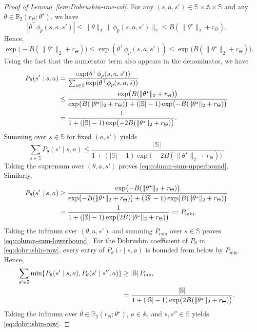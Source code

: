 \documentclass[10pt]{article} %
\theoremstyle{plain}
\theoremstyle{definition}
\theoremstyle{remark}
\newcommand{\bA}{\mathbb{A}}
\newcommand{\bB}{\mathbb{B}}
\newcommand{\bS}{\mathbb{S}}
\begin{document}
\begin{proof}[Proof of Lemma~\ref{lem:Dobrushin-row-col}]
For any \((s,a,s')\in\bS\times\bA\times\bS\) and any \(\theta\in\bB_2(r_\Theta;\theta^\star)\), we have
\[
|\theta^\top\phi_p(s,a,s')|\le\|\theta\|_2\,\|\phi_p(s,a,s')\|_2\le B(\|\theta^\star\|_2+r_\Theta).
\]
Hence,
\begin{equation}\label{eq:score-funct-bounds}
\exp\bigl(-B(\|\theta^\star\|_2+r_\Theta)\bigr)\le\exp(\theta^\top\phi_p(s,a,s'))\le\exp\bigl(B(\|\theta^\star\|_2+r_\Theta)\bigr).
\end{equation}
Using the fact that the numerator term also appears in the denominator, we have
\begin{align}\label{eq:kernel-uni-upperbound}
P_\theta(s'\mid s,a)
&=\frac{\exp(\theta^\top\phi_p(s,a,s'))}{\sum_{\bar s\in\bS}\exp(\theta^\top\phi_p(s,a,\bar s))}\notag\\
&\le \frac{\exp\bigl(B(\|\theta^\star\|_2+r_\Theta)\bigr)}
{\exp\bigl(B(\|\theta^\star\|_2+r_\Theta)\bigr)+(|\bS|-1)\exp\bigl(-B(\|\theta^\star\|_2+r_\Theta)\bigr)}\notag\\
&=
\frac{1}
{1+(|\bS|-1)\exp\bigl(-2B(\|\theta^\star\|_2+r_\Theta)\bigr)} .
\end{align}
Summing over \(s\in\bS\) for fixed \((a,s')\) yields
\[
\sum_{s\in\bS}P_\theta(s'\mid s,a)\le\frac{|\bS|}{1+(|\bS|-1)\exp\bigl(-2B(\|\theta^\star\|_2+r_\Theta)\bigr)} .
\]
Taking the supremum over \((\theta,a,s')\) proves \ref{eq:column-sum-upperbound}. Similarly,
\begin{align}\label{eq:kernel-uni-lowerbound}
P_\theta(s'\mid s,a)
&\ge\frac{\exp\bigl(-B(\|\theta^\star\|_2+r_\Theta)\bigr)}{\exp\bigl(-B(\|\theta^\star\|_2+r_\Theta)\bigr)+(|\bS|-1)\exp\bigl(B(\|\theta^\star\|_2+r_\Theta)\bigr)}\notag\\
&=\frac{1}{1+(|\bS|-1)\exp\bigl(2B(\|\theta^\star\|_2+r_\Theta)\bigr)}=:P_{\min}.
\end{align}
Taking the infimum over \((\theta,a,s')\) and summing \(P_{\min}\) over \(s\in\bS\) proves \ref{eq:column-sum-lowerbound}. For the Dobrushin coefficient of \(P_\theta\) in \ref{eq:dobrushin-row}, every entry of \(P_\theta(\cdot\mid s,a)\) is bounded from below by \(P_{\min}\). Hence,
\begin{align}\label{eq:dobcoef-p-lowerbound}
\sum_{s' \in\bS}\min\{P_\theta(s'\mid s,a),P_\theta(s'\mid s'',a)\}
&\ge|\bS|\,P_{\min}\notag\\
&=\frac{|\bS|}
{1+(|\bS|-1)\exp\bigl(2B(\|\theta^\star\|_2+r_\Theta)\bigr)} .
\end{align}
Taking the infimum over \(\theta\in\mathbb B_2(r_\Theta;\theta^\star)\), \(a\in\bA\), and \(s,s''\in\bS\) yields \ref{eq:dobrushin-row}.


\end{proof}
\end{document}
